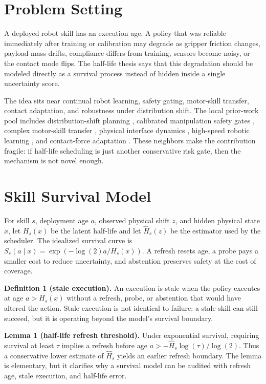\documentclass{article}
\begin{document}
\section{Problem Setting}

A deployed robot skill has an execution age. A policy that was reliable immediately after training or calibration may degrade as gripper friction changes, payload mass drifts, compliance differs from training, sensors become noisy, or the contact mode flips. The half-life thesis says that this degradation should be modeled directly as a survival process instead of hidden inside a single uncertainty score.

The idea sits near continual robot learning, safety gating, motor-skill transfer, contact adaptation, and robustness under distribution shift. The local prior-work pool includes distribution-shift planning \citep{skill_pomdp_shift}, calibrated manipulation safety gates \citep{uncertainty_safety_gating}, complex motor-skill transfer \citep{motor_skill_transfer}, physical interface dynamics \citep{interface_dynamics_exosuits}, high-speed robotic learning \citep{robotic_table_tennis}, and contact-force adaptation \citep{manipulation_force_profiles}. These neighbors make the contribution fragile: if half-life scheduling is just another conservative risk gate, then the mechanism is not novel enough.

\section{Skill Survival Model}

For skill $s$, deployment age $a$, observed physical shift $z$, and hidden physical state $x$, let $H_s(x)$ be the latent half-life and let $\hat H_s(z)$ be the estimator used by the scheduler. The idealized survival curve is $S_s(a\mid x)=\exp(-\log(2)a/H_s(x))$. A refresh resets age, a probe pays a smaller cost to reduce uncertainty, and abstention preserves safety at the cost of coverage.

\textbf{Definition 1 (stale execution).} An execution is stale when the policy executes at age $a>H_s(x)$ without a refresh, probe, or abstention that would have altered the action. Stale execution is not identical to failure: a stale skill can still succeed, but it is operating beyond the model's survival boundary.

\textbf{Lemma 1 (half-life refresh threshold).} Under exponential survival, requiring survival at least $\tau$ implies a refresh before age $a > -\hat H_s\log(\tau)/\log(2)$. Thus a conservative lower estimate of $\hat H_s$ yields an earlier refresh boundary. The lemma is elementary, but it clarifies why a survival model can be audited with refresh age, stale execution, and half-life error.
\end{document}
